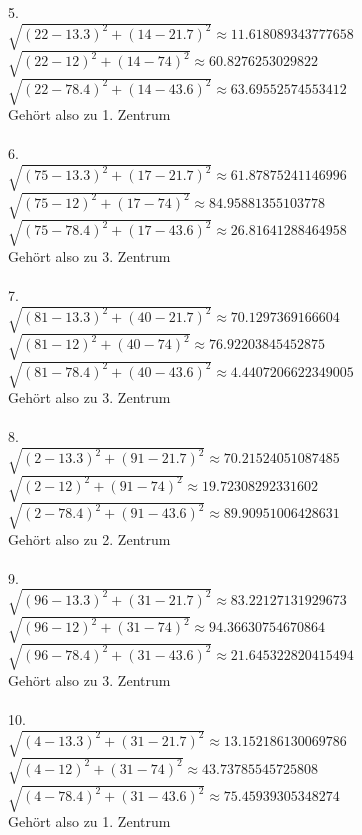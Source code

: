 \begin{enumerate}
5. \\ 
$\sqrt{(22-13.3)^2 + (14-21.7)^2} \approx 11.618089343777658$ \\ 
$\sqrt{(22-12)^2 + (14-74)^2} \approx 60.8276253029822$ \\ 
$\sqrt{(22-78.4)^2 + (14-43.6)^2} \approx 63.69552574553412$ \\ 
Gehört also zu 1. Zentrum \\ \\

6. \\ 
$\sqrt{(75-13.3)^2 + (17-21.7)^2} \approx 61.87875241146996$ \\ 
$\sqrt{(75-12)^2 + (17-74)^2} \approx 84.95881355103778$ \\ 
$\sqrt{(75-78.4)^2 + (17-43.6)^2} \approx 26.81641288464958$ \\ 
Gehört also zu 3. Zentrum \\ \\

7. \\ 
$\sqrt{(81-13.3)^2 + (40-21.7)^2} \approx 70.1297369166604$ \\ 
$\sqrt{(81-12)^2 + (40-74)^2} \approx 76.92203845452875$ \\ 
$\sqrt{(81-78.4)^2 + (40-43.6)^2} \approx 4.4407206622349005$ \\ 
Gehört also zu 3. Zentrum \\ \\

8. \\ 
$\sqrt{(2-13.3)^2 + (91-21.7)^2} \approx 70.21524051087485$ \\ 
$\sqrt{(2-12)^2 + (91-74)^2} \approx 19.72308292331602$ \\ 
$\sqrt{(2-78.4)^2 + (91-43.6)^2} \approx 89.90951006428631$ \\ 
Gehört also zu 2. Zentrum \\ \\

9. \\ 
$\sqrt{(96-13.3)^2 + (31-21.7)^2} \approx 83.22127131929673$ \\ 
$\sqrt{(96-12)^2 + (31-74)^2} \approx 94.36630754670864$ \\ 
$\sqrt{(96-78.4)^2 + (31-43.6)^2} \approx 21.645322820415494$ \\ 
Gehört also zu 3. Zentrum \\ \\

10. \\ 
$\sqrt{(4-13.3)^2 + (31-21.7)^2} \approx 13.152186130069786$ \\ 
$\sqrt{(4-12)^2 + (31-74)^2} \approx 43.73785545725808$ \\ 
$\sqrt{(4-78.4)^2 + (31-43.6)^2} \approx 75.45939305348274$ \\ 
Gehört also zu 1. Zentrum \\ \\


\end{enumerate}
